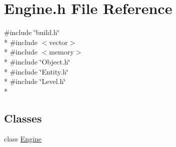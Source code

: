 \section{Engine.\-h File Reference}
\label{_engine_8h}
{\ttfamily \#include \char`\"{}build.\-h\char`\"{}}\\*
{\ttfamily \#include $<$vector$>$}\\*
{\ttfamily \#include $<$memory$>$}\\*
{\ttfamily \#include \char`\"{}Object.\-h\char`\"{}}\\*
{\ttfamily \#include \char`\"{}Entity.\-h\char`\"{}}\\*
{\ttfamily \#include \char`\"{}Level.\-h\char`\"{}}\\*
\subsection*{Classes}
\begin{DoxyCompactItemize}
\item 
class \hyperlink{class_engine}{Engine}
\end{DoxyCompactItemize}
